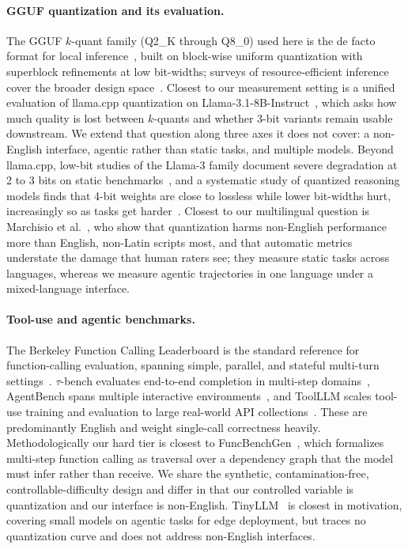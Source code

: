 \documentclass[11pt]{article}
\begin{document}
\paragraph{GGUF quantization and its evaluation.} The GGUF $k$-quant family (Q2\_K through Q8\_0) used here is the de facto format for local inference~\cite{llamacpp}, built on block-wise uniform quantization with superblock refinements at low bit-widths; surveys of resource-efficient inference cover the broader design space~\cite{quantsurvey}. Closest to our measurement setting is a unified evaluation of llama.cpp quantization on Llama-3.1-8B-Instruct~\cite{kquanteval}, which asks how much quality is lost between $k$-quants and whether 3-bit variants remain usable downstream. We extend that question along three axes it does not cover: a non-English interface, agentic rather than static tasks, and multiple models. Beyond llama.cpp, low-bit studies of the Llama-3 family document severe degradation at 2 to 3 bits on static benchmarks~\cite{huang2024llama3}, and a systematic study of quantized reasoning models finds that 4-bit weights are close to lossless while lower bit-widths hurt, increasingly so as tasks get harder~\cite{liu2025reasoning}. Closest to our multilingual question is Marchisio et al.~\cite{marchisio2024}, who show that quantization harms non-English performance more than English, non-Latin scripts most, and that automatic metrics understate the damage that human raters see; they measure static tasks across languages, whereas we measure agentic trajectories in one language under a mixed-language interface.

\paragraph{Tool-use and agentic benchmarks.} The Berkeley Function Calling Leaderboard is the standard reference for function-calling evaluation, spanning simple, parallel, and stateful multi-turn settings~\cite{bfcl}. $\tau$-bench evaluates end-to-end completion in multi-step domains~\cite{taubench}, AgentBench spans multiple interactive environments~\cite{agentbench}, and ToolLLM scales tool-use training and evaluation to large real-world API collections~\cite{toolllm}. These are predominantly English and weight single-call correctness heavily. Methodologically our hard tier is closest to FuncBenchGen~\cite{funcbenchgen}, which formalizes multi-step function calling as traversal over a dependency graph that the model must infer rather than receive. We share the synthetic, contamination-free, controllable-difficulty design and differ in that our controlled variable is quantization and our interface is non-English. TinyLLM~\cite{tinyllm} is closest in motivation, covering small models on agentic tasks for edge deployment, but traces no quantization curve and does not address non-English interfaces.
\end{document}
